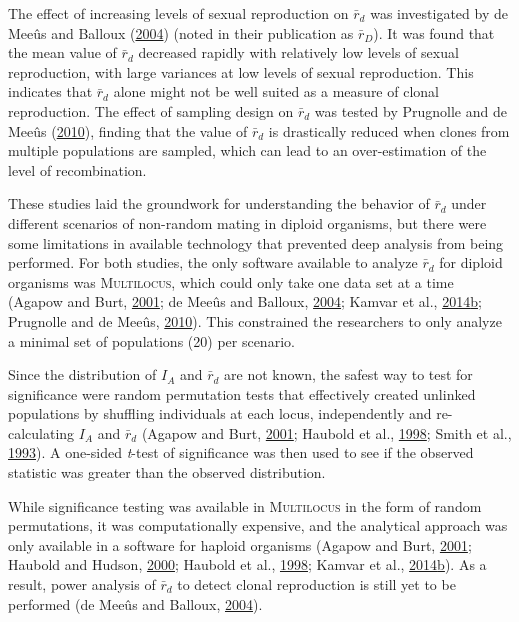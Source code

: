 \documentclass[double,12pt]{beavtex}
\begin{document}
  The effect of increasing levels of sexual reproduction on \(\bar{r}_d\)
  was investigated by de Meeûs and Balloux
  (\protect\hyperlink{ref-de2004clonal}{2004}) (noted in their publication
  as \(\bar{r}_D\)). It was found that the mean value of \(\bar{r}_d\)
  decreased rapidly with relatively low levels of sexual reproduction,
  with large variances at low levels of sexual reproduction. This
  indicates that \(\bar{r}_d\) alone might not be well suited as a measure
  of clonal reproduction. The effect of sampling design on \(\bar{r}_d\)
  was tested by Prugnolle and de Meeûs
  (\protect\hyperlink{ref-prugnolle2010apparent}{2010}), finding that the
  value of \(\bar{r}_d\) is drastically reduced when clones from multiple
  populations are sampled, which can lead to an over-estimation of the
  level of recombination.
  
  These studies laid the groundwork for understanding the behavior of
  \(\bar{r}_d\) under different scenarios of non-random mating in diploid
  organisms, but there were some limitations in available technology that
  prevented deep analysis from being performed. For both studies, the only
  software available to analyze \(\bar{r}_d\) for diploid organisms was
  \textsc{Multilocus}, which could only take one data set at a time
  (Agapow and Burt, \protect\hyperlink{ref-Agapowux5f2001}{2001}; de Meeûs
  and Balloux, \protect\hyperlink{ref-de2004clonal}{2004}; Kamvar et al.,
  \protect\hyperlink{ref-kamvar2014poppr}{2014}\protect\hyperlink{ref-kamvar2014poppr}{b};
  Prugnolle and de Meeûs,
  \protect\hyperlink{ref-prugnolle2010apparent}{2010}). This constrained
  the researchers to only analyze a minimal set of populations (20) per
  scenario.
  
  Since the distribution of \(I_A\) and \(\bar{r}_d\) are not known, the
  safest way to test for significance were random permutation tests that
  effectively created unlinked populations by shuffling individuals at
  each locus, independently and re-calculating \(I_A\) and \(\bar{r}_d\)
  (Agapow and Burt, \protect\hyperlink{ref-Agapowux5f2001}{2001}; Haubold
  et al., \protect\hyperlink{ref-haubold1998detecting}{1998}; Smith et
  al., \protect\hyperlink{ref-smith1993how}{1993}). A one-sided
  \emph{t}-test of significance was then used to see if the observed
  statistic was greater than the observed distribution.
  
  While significance testing was available in \textsc{Multilocus} in the
  form of random permutations, it was computationally expensive, and the
  analytical approach was only available in a software for haploid
  organisms (Agapow and Burt,
  \protect\hyperlink{ref-Agapowux5f2001}{2001}; Haubold and Hudson,
  \protect\hyperlink{ref-haubold2000lian}{2000}; Haubold et al.,
  \protect\hyperlink{ref-haubold1998detecting}{1998}; Kamvar et al.,
  \protect\hyperlink{ref-kamvar2014poppr}{2014}\protect\hyperlink{ref-kamvar2014poppr}{b}).
  As a result, power analysis of \(\bar{r}_d\) to detect clonal
  reproduction is still yet to be performed (de Meeûs and Balloux,
  \protect\hyperlink{ref-de2004clonal}{2004}).
  
\end{document}
